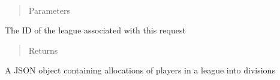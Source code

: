 \documentclass[letterpaper,10pt,english]{sphinxmanual}
\begin{document}

\begin{fulllineitems}
\label{\detokenize{tiger_leagues/readme:tiger_leagues.admin.allocate_league_divisions}}~\begin{quote}\begin{description}
\item[{Parameters}] \leavevmode
{} \textendash{} 

\end{description}\end{quote}

The ID of the league associated with this request
\begin{quote}\begin{description}
\item[{Returns}] \leavevmode
{}

\end{description}\end{quote}

A JSON object containing allocations of players in a league into divisions

\end{fulllineitems}

\end{document}
